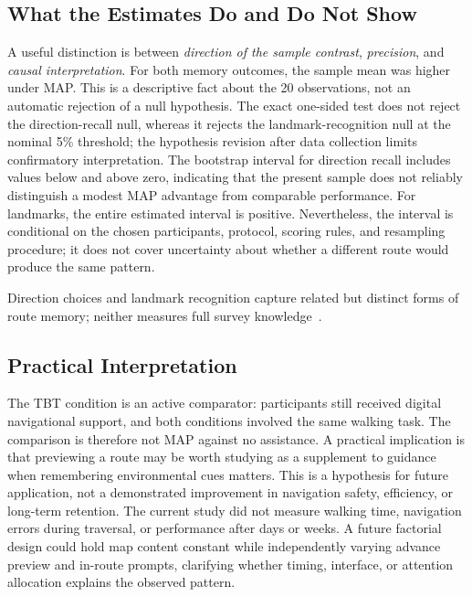 \subsection{What the Estimates Do and Do Not Show}
A useful distinction is between \emph{direction of the sample contrast}, \emph{precision}, and \emph{causal interpretation}. For both memory outcomes, the sample mean was higher under MAP. This is a descriptive fact about the 20 observations, not an automatic rejection of a null hypothesis. The exact one-sided test does not reject the direction-recall null, whereas it rejects the landmark-recognition null at the nominal 5\% threshold; the hypothesis revision after data collection limits confirmatory interpretation. The bootstrap interval for direction recall includes values below and above zero, indicating that the present sample does not reliably distinguish a modest MAP advantage from comparable performance. For landmarks, the entire estimated interval is positive. Nevertheless, the interval is conditional on the chosen participants, protocol, scoring rules, and resampling procedure; it does not cover uncertainty about whether a different route would produce the same pattern.

Direction choices and landmark recognition capture related but distinct forms of route memory; neither measures full survey knowledge~\cite{kim_landmark_2021}.

\subsection{Practical Interpretation}
The TBT condition is an active comparator: participants still received digital navigational support, and both conditions involved the same walking task. The comparison is therefore not MAP against no assistance. A practical implication is that previewing a route may be worth studying as a supplement to guidance when remembering environmental cues matters. This is a hypothesis for future application, not a demonstrated improvement in navigation safety, efficiency, or long-term retention. The current study did not measure walking time, navigation errors during traversal, or performance after days or weeks. A future factorial design could hold map content constant while independently varying advance preview and in-route prompts, clarifying whether timing, interface, or attention allocation explains the observed pattern.

